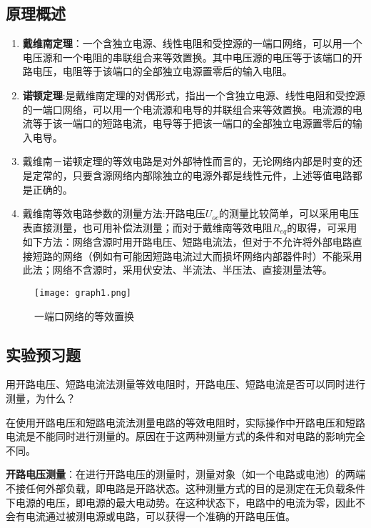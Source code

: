 \documentclass[dvipsnames, svgnames,a4paper,11pt]{article}
\begin{document}
	\subsection{原理概述}
		\begin{enumerate}
			\item \textbf{戴维南定理}：一个含独立电源、线性电阻和受控源的一端口网络，可以用一个电压源和一个电阻的串联组合来等效置换。其中电压源的电压等于该端口的开路电压，电阻等于该端口的全部独立电源置零后的输入电阻。
			\item \textbf{诺顿定理}:是戴维南定理的对偶形式，指出一个含独立电源、线性电阻和受控源的一端口网络，可以用一个电流源和电导的并联组合来等效置换。电流源的电流等于该一端口的短路电流，电导等于把该一端口的全部独立电源置零后的输入电导。
			\item 戴维南－诺顿定理的等效电路是对外部特性而言的，无论网络内部是时变的还是定常的，只要含源网络内部除独立的电源外都是线性元件，上述等值电路都是正确的。
			\item 戴维南等效电路参数的测量方法:开路电压$U_{oc}$的测量比较简单，可以采用电压表直接测量，也可用补偿法测量；而对于戴维南等效电阻$R_{eq}$的取得，可采用如下方法：网络含源时用开路电压、短路电流法，但对于不允许将外部电路直接短路的网络（例如有可能因短路电流过大而损坏网络内部器件时）不能采用此法；网络不含源时，采用伏安法、半流法、半压法、直接测量法等。


		\end{enumerate}
		\begin{figure}[htbp]
			\centering
			\texttt{[image: graph1.png]}
			\caption{一端口网络的等效置换}
			\label{fig:graph1}
		\end{figure}
	
	
	\subsection{实验预习题}
	
	\begin{question}
		用开路电压、短路电流法测量等效电阻时，开路电压、短路电流是否可以同时进行测量，为什么？
	\end{question}
	
	在使用开路电压和短路电流法测量电路的等效电阻时，实际操作中开路电压和短路电流是不能同时进行测量的。原因在于这两种测量方式的条件和对电路的影响完全不同。
	
	\textbf{开路电压测量}：在进行开路电压的测量时，测量对象（如一个电路或电池）的两端不接任何外部负载，即电路是开路状态。这种测量方式的目的是测定在无负载条件下电源的电压，即电源的最大电动势。在这种状态下，电路中的电流为零，因此不会有电流通过被测电源或电路，可以获得一个准确的开路电压值。
	
\end{document}
